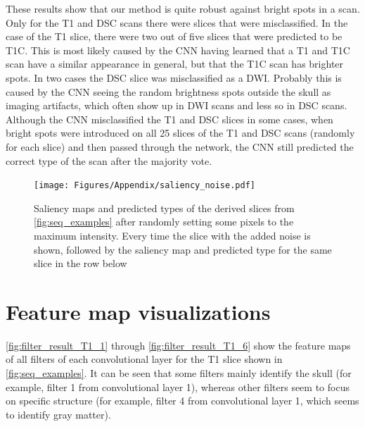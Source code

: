 \begin{subappendices}
These results show that our method is quite robust against bright spots in a \gls{scan}.
Only for the \gls{T1} and \gls{DSC} \glspl{scan} there were \glspl{slice} that were misclassified.
In the case of the \gls{T1} \gls{slice}, there were two out of five \glspl{slice} that were predicted to be \gls{T1C}.
This is most likely caused by the \gls{CNN} having learned that a \gls{T1} and \gls{T1C} \gls{scan} have a similar appearance in general, but that the \gls{T1C} \gls{scan} has brighter spots.
In two cases the \gls{DSC} \gls{slice} was misclassified as a \gls{DWI}.
Probably this is caused by the \gls{CNN} seeing the random brightness spots outside the skull as imaging artifacts, which often show up in \gls{DWI} \glspl{scan} and less so in \gls{DSC} \glspl{scan}.
Although the \gls{CNN} misclassified the \gls{T1} and \gls{DSC} \glspl{slice} in some cases, when bright spots were introduced on all \num{25} \glspl{slice} of the \gls{T1} and \gls{DSC} \glspl{scan} (randomly for each \gls{slice}) and then passed through the network, the \gls{CNN} still predicted the correct \gls{type} of the \gls{scan} after the majority vote.

\begin{figure}[ht]
    \centering
    \texttt{[image: Figures/Appendix/saliency\_noise.pdf]}
    \caption{Saliency maps and predicted \glspl{type} of the derived \glspl{slice} from \cref{fig:seq_examples} after randomly setting some pixels to the maximum intensity.
    Every time the \gls{slice} with the added noise is shown, followed by the saliency map and predicted \gls{type} for the same \gls{slice} in the row below}
    \label{fig:bright_noise}
\end{figure}



\clearpage

\section{Feature map visualizations}
\label{app:filtervis}

\cref{fig:filter_result_T1_1} through \cref{fig:filter_result_T1_6} show the feature maps of all filters of each convolutional layer for the \gls{T1} \gls{slice} shown in \cref{fig:seq_examples}.
It can be seen that some filters mainly identify the skull (for example, filter 1 from convolutional layer 1), whereas other filters seem to focus on specific structure (for example, filter 4 from convolutional layer 1, which seems to identify gray matter).


\end{subappendices}
